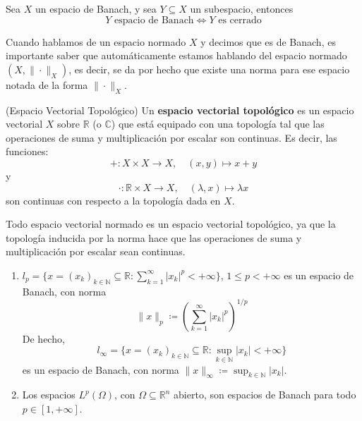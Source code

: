 \documentclass[12pt]{book}
\newcommand{\tbf}{\textbf}
\newcommand{\R}{\mathbb{R}}
\newcommand{\C}{\mathbb{C}}
\newcommand{\N}{\mathbb{N}}
\begin{document}
\begin{prop}
    Sea $X$ un espacio de Banach, y sea $Y\subseteq X$ un subespacio, entonces 
    \begin{equation*}
        Y \text{ espacio de Banach} \iff Y \text{ es cerrado}
    \end{equation*}
\end{prop}


\begin{observacion}
    Cuando hablamos de un espacio normado $X$ y decimos que es de Banach, es importante saber que automáticamente estamos hablando del espacio normado $(X,\|\cdot\|_X)$, es decir, se da por hecho que existe una norma para ese espacio notada de la forma $\|\cdot\|_X$. \\
\end{observacion}

\begin{definicion}(Espacio Vectorial Topológico)
    Un \tbf{espacio vectorial topológico} es un espacio vectorial $X$ sobre $\R$ (o $\C$) que está equipado con una topología tal que las operaciones de suma y multiplicación por escalar son continuas. Es decir, las funciones:
    \begin{equation*}
        + : X \times X \longrightarrow X, \quad (x,y) \mapsto x + y
    \end{equation*}
    y
    \begin{equation*}
        \cdot : \R \times X \longrightarrow X, \quad (\lambda, x) \mapsto \lambda x
    \end{equation*}
    son continuas con respecto a la topología dada en $X$.
\end{definicion}

\begin{observacion}
    Todo espacio vectorial normado es un espacio vectorial topológico, ya que la topología inducida por la norma hace que las operaciones de suma y multiplicación por escalar sean continuas.
\end{observacion}



\begin{ejemplo}
    \begin{enumerate}
        \item $l_p=\{x=(x_k)_{k\in\N}\subseteq \R : \sum\limits_{k=1}^\infty |x_k|^p < +\infty\}$, $1 \leq p < +\infty$ es un espacio de Banach, con norma
        \begin{equation*}
            \|x\|_p \coloneqq \left( \sum_{k=1}^\infty |x_k|^p \right)^{1/p}
        \end{equation*}
        De hecho, 
        \begin{equation*}
            l_{\infty} = \{x=(x_k)_{k\in\N}\subseteq \R : \sup_{k\in\N} |x_k| < +\infty\}
        \end{equation*}
        es un espacio de Banach, con norma $\|x\|_\infty \coloneqq \sup_{k\in\N} |x_k|$.
        \item Los espacios $L^p(\Omega)$, con $\Omega \subseteq \mathbb{R}^n$ abierto, son espacios de Banach para todo $p \in [1, +\infty]$. \\
        \end{enumerate}
\end{ejemplo}
\end{document}
